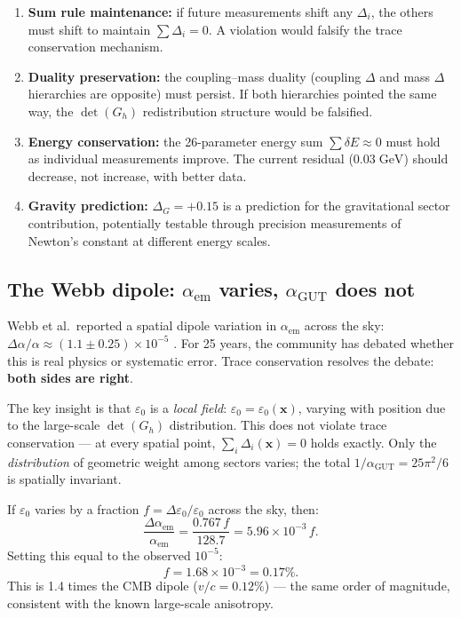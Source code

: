 \documentclass[12pt]{article}
\theoremstyle{remark}
\theoremstyle{definition}
\begin{document}
\begin{enumerate}
\item \textbf{Sum rule maintenance:} if future measurements shift any $\Delta_i$, the others must shift to maintain $\sum \Delta_i = 0$. A violation would falsify the trace conservation mechanism.

\item \textbf{Duality preservation:} the coupling--mass duality (coupling $\Delta$ and mass $\Delta$ hierarchies are opposite) must persist. If both hierarchies pointed the same way, the $\det(G_h)$ redistribution structure would be falsified.

\item \textbf{Energy conservation:} the 26-parameter energy sum $\sum \delta E \approx 0$ must hold as individual measurements improve. The current residual ($0.03\;\text{GeV}$) should decrease, not increase, with better data.

\item \textbf{Gravity prediction:} $\Delta_G = +0.15$ is a prediction for the gravitational sector contribution, potentially testable through precision measurements of Newton's constant at different energy scales.
\end{enumerate}

\subsection{The Webb dipole: $\alpha_\text{em}$ varies, $\alpha_\text{GUT}$ does not}

Webb et al.\ reported a spatial dipole variation in $\alpha_\text{em}$ across the sky: $\Delta\alpha/\alpha \approx (1.1 \pm 0.25) \times 10^{-5}$ \cite{Webb}. For 25 years, the community has debated whether this is real physics or systematic error. Trace conservation resolves the debate: \textbf{both sides are right}.

The key insight is that $\varepsilon_0$ is a \emph{local field}: $\varepsilon_0 = \varepsilon_0(\mathbf{x})$, varying with position due to the large-scale $\det(G_h)$ distribution. This does not violate trace conservation --- at every spatial point, $\sum_i \Delta_i(\mathbf{x}) = 0$ holds exactly. Only the \emph{distribution} of geometric weight among sectors varies; the total $1/\alpha_\text{GUT} = 25\pi^2/6$ is spatially invariant.

If $\varepsilon_0$ varies by a fraction $f = \Delta\varepsilon_0/\varepsilon_0$ across the sky, then:
\begin{equation}
\frac{\Delta\alpha_\text{em}}{\alpha_\text{em}} = \frac{0.767\,f}{128.7} = 5.96 \times 10^{-3}\,f.
\end{equation}
Setting this equal to the observed $10^{-5}$:
\begin{equation}
f = 1.68 \times 10^{-3} = 0.17\%.
\end{equation}
This is 1.4 times the CMB dipole ($v/c = 0.12\%$) --- the same order of magnitude, consistent with the known large-scale anisotropy.
\end{document}
